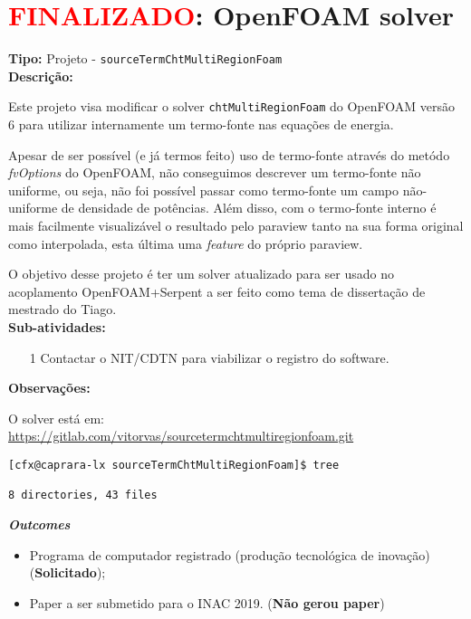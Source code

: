 \chapter{\textcolor{red}{FINALIZADO}: OpenFOAM solver} 

\textbf{Tipo:} Projeto - \texttt{sourceTermChtMultiRegionFoam}\\

\textbf{Descrição:}

Este projeto visa modificar o solver \texttt{chtMultiRegionFoam} do 
OpenFOAM versão 6 para utilizar internamente um termo-fonte nas equações 
de energia.

Apesar de ser possível (e já termos feito) uso de termo-fonte através do 
metódo \textit{fvOptions} do OpenFOAM, não conseguimos descrever um termo-fonte
não uniforme, ou seja, não foi possível passar como termo-fonte um campo não-uniforme
de densidade de potências. Além disso, com o termo-fonte interno é mais facilmente 
visualizável o resultado pelo paraview tanto na sua forma original como interpolada, esta
última uma \textit{feature} do próprio paraview.

O objetivo desse projeto é ter um solver atualizado para ser usado no acoplamento 
OpenFOAM+Serpent a ser feito como tema de dissertação de mestrado 
do Tiago.\\

\textbf{Sub-atividades:}

\begin{itemize}
  \item[1] Contactar o NIT/CDTN para viabilizar o registro do software.
\end{itemize}

\textbf{Observações:}

O solver está em:\\
 \url{https://gitlab.com/vitorvas/sourcetermchtmultiregionfoam.git}\\

\begin{verbatim}
[cfx@caprara-lx sourceTermChtMultiRegionFoam]$ tree

8 directories, 43 files
\end{verbatim}

\textbf{\textit{Outcomes}}

\begin{itemize}
	\item Programa de computador registrado (produção tecnológica de inovação) (\textbf{Solicitado});
	\item Paper a ser submetido para o INAC 2019. (\textbf{Não gerou paper})
\end{itemize}


